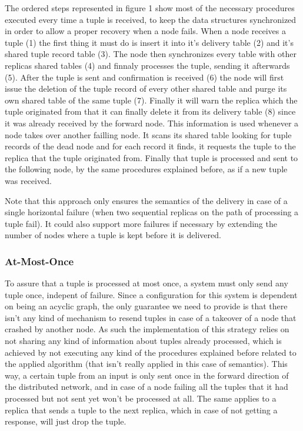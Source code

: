 \documentclass[times, 10pt,twocolumn]{article}
\newcommand{\forceindent}{\leavevmode{\parindent=1em\indent}}
\begin{document}
The ordered steps represented in figure 1 show most of the necessary
procedures executed every time a tuple is received, to keep the data
structures synchronized in order to allow a proper recovery when a node
fails. When a node receives a tuple (1) the first thing it must do is
insert it into it's delivery table (2) and it's shared tuple record table
(3). The node then synchronizes every table with other replicas shared
tables (4) and finnaly processes the tuple, sending it afterwards (5).
After the tuple is sent and confirmation is received (6) the node will
first issue the deletion of the tuple record of every other shared table
and purge its own shared table of the same tuple (7). Finally it will warn
the replica which the tuple originated from that it can finally delete it
from its delivery table (8) since it was already received by the forward
node. This information is used whenever a node takes over another failling
node. It scans its shared table looking for tuple records of the dead node
and for each record it finds, it requests the tuple to the replica that
the tuple originated from. Finally that tuple is processed and sent to the
following node, by the same procedures explained before, as if a new tuple
was received. 

Note that this approach only ensures the semantics of the delivery in case
of a single horizontal failure (when two sequential replicas on the path
of processing a tuple fail). It could also support more failures if
necessary by extending the number of nodes where a tuple is kept before it
is delivered.




\subsubsection{At-Most-Once}

\forceindent To assure that a tuple is processed at most once, a system
must only send any tuple once, indepent of failure. Since a configuration
for this system is dependent on being an acyclic graph, the only guarantee
we need to provide is that there isn't any kind of mechanism to resend
tuples in case of a takeover of a node that crashed by another node.  As
such the implementation of this strategy relies on not sharing any kind of
information about tuples already processed, which is achieved by not
executing any kind of the procedures explained before related to the
applied algorithm (that isn't really applied in this case of semantics).
This way, a certain tuple from an input is only sent once in the forward
direction of the distributed network, and in case of a node failing all
the tuples that it had processed but not sent yet won't be processed at
all. The same applies to a replica that sends a tuple to the next replica,
which in case of not getting a response, will just drop the tuple.
\end{document}
